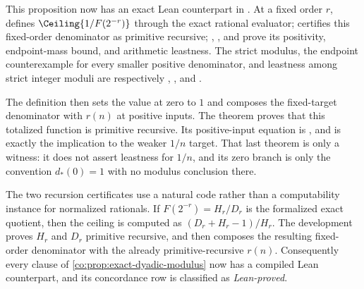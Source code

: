 This proposition now has an exact Lean counterpart in
.  At a fixed
order $r$,  defines
$\Ceiling{1/F(2^{-r})}$ through the exact rational evaluator;
 certifies this
fixed-order denominator as primitive recursive;
,
,
and  prove its
positivity, endpoint-mass bound, and arithmetic leastness.  The strict modulus,
the endpoint counterexample for every smaller positive denominator, and
leastness among strict integer moduli are respectively
,
, and
.

The definition  then
sets the value at zero to $1$ and composes the fixed-target denominator with
$r(n)$ at positive inputs.  The theorem
 proves that
this totalized function is primitive recursive.  Its positive-input equation is
, and
is exactly the implication to the weaker $1/n$ target.  That last theorem is
only a witness: it does not assert leastness for $1/n$, and its zero branch is
only the convention $d_*(0)=1$ with no modulus conclusion there.

The two recursion certificates use a natural code rather than a computability
instance for normalized rationals.  If
$F(2^{-r})=H_r/D_r$ is the formalized exact quotient, then the ceiling is
computed as $(D_r+H_r-1)/H_r$.  The development proves $H_r$ and $D_r$
primitive recursive, and then composes the resulting fixed-order denominator
with the already primitive-recursive $r(n)$.  Consequently every clause of
\cref{co:prop:exact-dyadic-modulus} now has a compiled Lean counterpart, and
its concordance row is classified as \emph{Lean-proved}.

